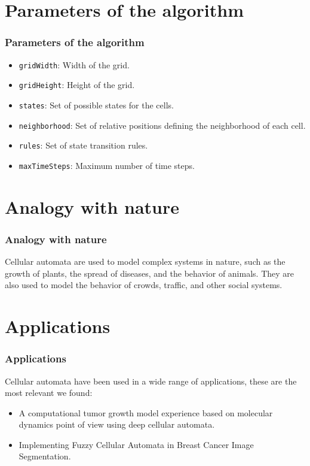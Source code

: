 \documentclass{beamer}
\begin{document}
\section{Parameters of the algorithm}
\begin{frame}
    \frametitle{Parameters of the algorithm}
    \begin{itemize}
        \item \texttt{gridWidth}: Width of the grid.
        \item \texttt{gridHeight}: Height of the grid.
        \item \texttt{states}: Set of possible states for the cells.
        \item \texttt{neighborhood}: Set of relative positions defining the neighborhood of each cell.
        \item \texttt{rules}: Set of state transition rules.
        \item \texttt{maxTimeSteps}: Maximum number of time steps.
    \end{itemize}
\end{frame}

\section{Analogy with nature}
\begin{frame}
    \frametitle{Analogy with nature}
    Cellular automata are used to model complex systems in nature, such as the growth of plants, the spread of diseases, and the behavior of animals. They are also used to model the behavior of crowds, traffic, and other social systems.
\end{frame}

\section{Applications}
\begin{frame}
    \frametitle{Applications}
    Cellular automata have been used in a wide range of applications, these are the most relevant we found:
    \begin{itemize}
        \item A computational tumor growth model experience based on
        molecular dynamics point of view using deep cellular automata.
        \item Implementing Fuzzy Cellular Automata in Breast Cancer
        Image Segmentation.
    \end{itemize}
\end{frame}
\end{document}
